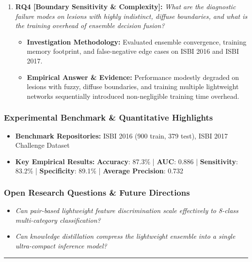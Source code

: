 \begin{enumerate}[label=\textbf{\arabic*.}, leftmargin=*]
\begin{itemize}[leftmargin=1.5em]
    \item \textbf{Empirical Answer \& Evidence:} Automated segmentation successfully isolated lesion contours end-to-end, providing clean input patches to downstream pair-based classification networks.
  \end{itemize}
  \item \textbf{RQ4 [Boundary Sensitivity \& Complexity]:} \textit{What are the diagnostic failure modes on lesions with highly indistinct, diffuse boundaries, and what is the training overhead of ensemble decision fusion?}
  \begin{itemize}[leftmargin=1.5em]
    \item \textbf{Investigation Methodology:} Evaluated ensemble convergence, training memory footprint, and false-negative edge cases on ISBI 2016 and ISBI 2017.
    \item \textbf{Empirical Answer \& Evidence:} Performance modestly degraded on lesions with fuzzy, diffuse boundaries, and training multiple lightweight networks sequentially introduced non-negligible training time overhead.
  \end{itemize}
\end{enumerate}

\subsubsection*{Experimental Benchmark \& Quantitative Highlights}
\begin{itemize}[leftmargin=*]
  \item \textbf{Benchmark Repositories:} ISBI 2016 (900 train, 379 test), ISBI 2017 Challenge Dataset
  \item \textbf{Key Empirical Results:} \textbf{Accuracy}: 87.3\% \quad | \quad \textbf{AUC}: 0.886 \quad | \quad \textbf{Sensitivity}: 83.2\% \quad | \quad \textbf{Specificity}: 89.1\% \quad | \quad \textbf{Average Precision}: 0.732
\end{itemize}

\subsubsection*{Open Research Questions \& Future Directions}
\begin{itemize}[leftmargin=*]
  \item \textit{Can pair-based lightweight feature discrimination scale effectively to 8-class multi-category classification?}
  \item \textit{Can knowledge distillation compress the lightweight ensemble into a single ultra-compact inference model?}
\end{itemize}
\vspace{0.8em}\hrule\vspace{1.2em}
